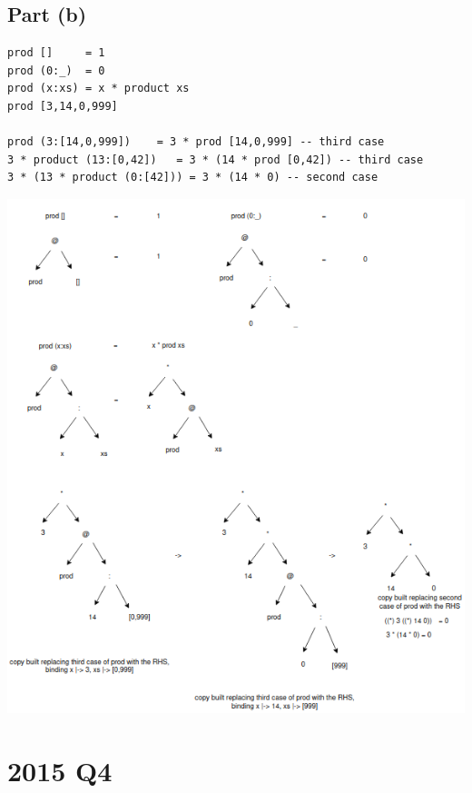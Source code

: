\documentclass[11pt]{article}
\begin{document}
\subsection{Part (b)}
\label{sec:org48eeeaf}
\begin{verbatim}
prod []     = 1
prod (0:_)  = 0
prod (x:xs) = x * product xs
prod [3,14,0,999]

prod (3:[14,0,999])    = 3 * prod [14,0,999] -- third case
3 * product (13:[0,42])   = 3 * (14 * prod [0,42]) -- third case
3 * (13 * product (0:[42])) = 3 * (14 * 0) -- second case
\end{verbatim}
\begin{center}
\includegraphics[width=155mm]{./prod-xs.png}
\end{center}
\section{2015 Q4}
\label{sec:orgaa7df96}
\end{document}
